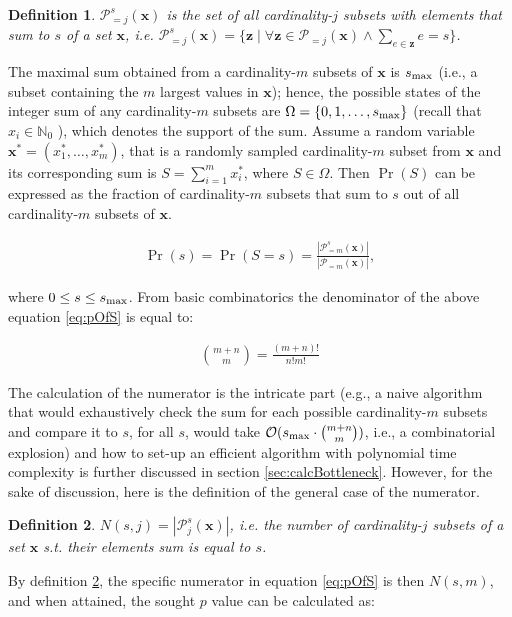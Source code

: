 \documentclass[a4paper]{article}
\newtheorem{mydef}{Definition}
\begin{document}
\begin{mydef} $\mathcal{P}^s_{=j}(\bm{x})$ is the set of all cardinality-$j$ subsets with elements that sum to $s$ of a set $\bm{x}$, i.e. $\mathcal{P}^s_{=j}(\bm{x})=\{  \bm{z} \mid \forall \bm{z}\in \mathcal{P}_{=j}(\bm{x}) \land \sum_{e \in \bm{z}}e=s \}$.\end{mydef}

The maximal sum obtained from a cardinality-$m$ subsets of $\bm{x}$ is $s_{\rm max}$ (i.e., a subset containing the $m$ largest values in $\bm{x}$); hence, the possible states of the integer sum of any cardinality-$m$ subsets are $\Omega=\{0,1,\ldots,s_{\rm max}\}$ (recall that $x_{i}\in \mathbb{N}_0$ ), which denotes the support of the sum. Assume a random variable $\bm{x}^{*}=(x^{*}_1,\ldots,x^{*}_m)$, that is a randomly sampled cardinality-$m$ subset from $\bm{x}$ and its corresponding sum is $S=\sum_{i=1}^m x^{*}_i$, where $S\in \Omega$. Then $\Pr(S)$ can be expressed as the fraction of cardinality-$m$ subsets that sum to $s$ out of all cardinality-$m$ subsets of $\bm{x}$.

\begin{align}
\label{eq:pOfS}
\Pr(s) = \Pr(S = s) = \frac{|\mathcal{P}^s_{=m}(\bm{x})|}{|\mathcal{P}_{=m}(\bm{x})|},
\end{align}

where $0\leq s \leq s_{\rm max}$. From basic combinatorics the denominator of the above equation \ref{eq:pOfS} is equal to:

\begin{align*}
{m+n \choose m} = \frac{(m+n)!}{n!m!}
\end{align*}

The calculation of the numerator is the intricate part (e.g., a naive algorithm that would exhaustively check the sum for each possible cardinality-$m$ subsets and compare it to $s$, for all $s$, would take $\mathcal{O}(s_{\rm max} \cdot {m+n \choose m})$, i.e., a combinatorial explosion) and how to set-up an efficient algorithm with polynomial time complexity is further discussed in section \ref{sec:calcBottleneck}. However, for the sake of discussion, here is the definition of the general case of the numerator.

\begin{mydef}
\label{def:numerator}
$N(s,j)=|\mathcal{P}^s_j(\bm{x})|$, i.e. the number of cardinality-$j$ subsets of a set $\bm{x}$ s.t. their elements sum is equal to $s$.
\end{mydef}

By definition \ref{def:numerator}, the specific numerator in equation \ref{eq:pOfS} is then $N(s,m)$, and when attained, the sought $p$ value can be calculated as:
\end{document}
